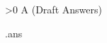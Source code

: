 
\def\source{\smallskip\noindent{\bf Source: }}
\immediate\closeout\ans
\vfill
{}\eject
{}
\parindent=30pt
\ifnum\excount>0 \beginsection A (Draft Answers)

  \jobname.ans \fi
\bye
